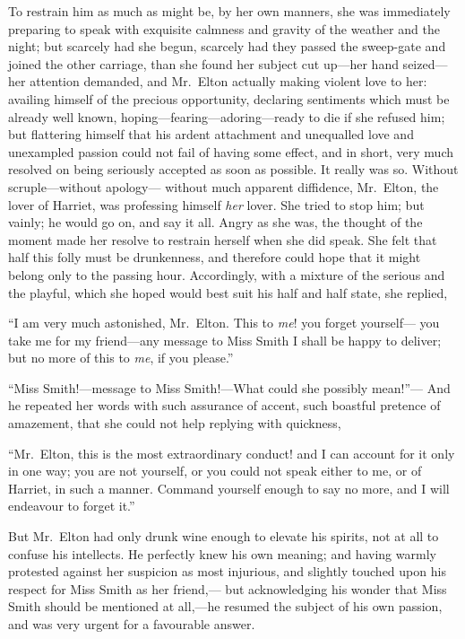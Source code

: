 To restrain him as much as might be, by her own manners, she was
immediately preparing to speak with exquisite calmness and gravity
of the weather and the night; but scarcely had she begun, scarcely had
they passed the sweep-gate and joined the other carriage, than she
found her subject cut up---her hand seized---her attention demanded,
and Mr.\ Elton actually making violent love to her:  availing himself
of the precious opportunity, declaring sentiments which must be already
well known, hoping---fearing---adoring---ready to die if she refused him;
but flattering himself that his ardent attachment and unequalled
love and unexampled passion could not fail of having some effect,
and in short, very much resolved on being seriously accepted as soon
as possible.  It really was so.  Without scruple---without apology---%
without much apparent diffidence, Mr.\ Elton, the lover of Harriet,
was professing himself \emph{her} lover.  She tried to stop him; but vainly;
he would go on, and say it all.  Angry as she was, the thought of
the moment made her resolve to restrain herself when she did speak.
She felt that half this folly must be drunkenness, and therefore
could hope that it might belong only to the passing hour.
Accordingly, with a mixture of the serious and the playful, which she
hoped would best suit his half and half state, she replied,

``I am very much astonished, Mr.\ Elton.  This to \emph{me}! you forget yourself---%
you take me for my friend---any message to Miss Smith I shall
be happy to deliver; but no more of this to \emph{me}, if you please.''

``Miss Smith!---message to Miss Smith!---What could she possibly mean!''---%
And he repeated her words with such assurance of accent, such boastful
pretence of amazement, that she could not help replying with quickness,

``Mr.\ Elton, this is the most extraordinary conduct! and I can account
for it only in one way; you are not yourself, or you could not speak
either to me, or of Harriet, in such a manner.  Command yourself
enough to say no more, and I will endeavour to forget it.''

But Mr.\ Elton had only drunk wine enough to elevate his spirits,
not at all to confuse his intellects.  He perfectly knew his own meaning;
and having warmly protested against her suspicion as most injurious,
and slightly touched upon his respect for Miss Smith as her friend,---%
but acknowledging his wonder that Miss Smith should be mentioned
at all,---he resumed the subject of his own passion, and was very
urgent for a favourable answer.

